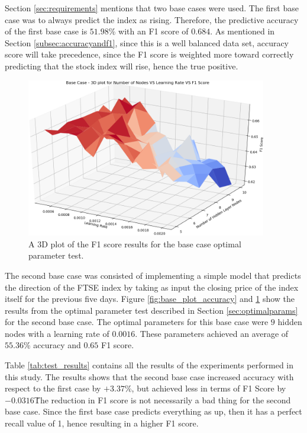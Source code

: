 \documentclass{UoYCSproject}
\begin{document}
Section \ref{sec:requirements} mentions that two base cases were used. The first base case was to always predict the index as rising. Therefore, the predictive accuracy of the first base case is $51.98$\% with an F1 score of $0.684$. As mentioned in Section \ref{subsec:accuracyandf1}, since this is a well balanced data set, accuracy score will take precedence, since the F1 score is weighted more toward correctly predicting that the stock index will rise, hence the true positive.

\begin{figure}[h]
\includegraphics[width=10.5cm]{base_f1.png}
\centering
\caption{A 3D plot of the F1 score results for the base case optimal parameter test.} 
\label{fig:base_plot_f1}
\end{figure}

The second base case was consisted of implementing a simple model that predicts the direction of the FTSE index by taking as input the closing price of the index itself for the previous five days. Figure \ref{fig:base_plot_accuracy} and \ref{fig:base_plot_f1} show the results from the optimal parameter test described in Section \ref{sec:optimalparams} for the second base  case. The optimal parameters for this base case were $9$ hidden nodes with a learning rate of $0.0016$. These parameters achieved an average of $55.36$\% accuracy and $0.65$ F1 score.

Table \ref{tab:test_results} contains all the results of the experiments performed in this study. The results shows that the second base case increased accuracy with respect to the first case by $+3.37$\%, but achieved less in terms of F1 Score by $-0.0316$\. The reduction in F1 score is not necessarily a bad thing for the second base case. Since the first base case predicts everything as up, then it has a perfect recall value of 1, hence resulting in a higher F1 score. 
\end{document}
